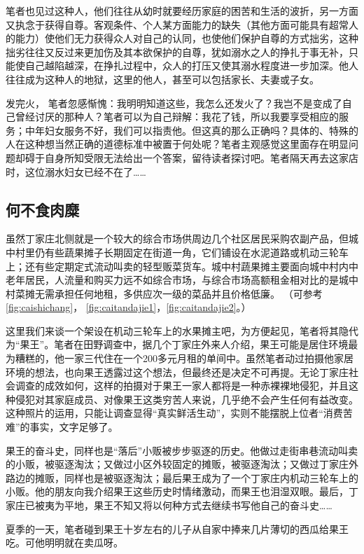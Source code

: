   笔者也见过这种人，他们往往从幼时就要经历家庭的困苦和生活的波折，另一方面又执念于获得自尊。客观条件、个人某方面能力的缺失（其他方面可能具有超常人的能力）使他们无力获得众人对自己的认同，也使他们保护自尊的方式拙劣，这种拙劣往往又反过来更加伤及其本欲保护的自尊，犹如溺水之人的挣扎于事无补，只能使自己越陷越深，在挣扎过程中，众人的打压又使其溺水程度进一步加深。他人往往成为这种人的地狱，这里的他人，甚至可以包括家长、夫妻或子女。

  发完火， 笔者忽感惭愧：我明明知道这些，我怎么还发火了？我岂不是变成了自己曾经讨厌的那种人？笔者可以为自己辩解：我花了钱，所以我要享受相应的服务；中年妇女服务不好，我们可以指责他。但这真的那么正确吗？具体的、特殊的人在这种想当然正确的道德标准中被置于何处呢？笔者主观感觉这里面存在明显问题却碍于自身所知受限无法给出一个答案，留待读者探讨吧。笔者隔天再去这家店时，这位溺水妇女已经不在了……

  \subsection{何不食肉糜}

  虽然丁家庄北侧就是一个较大的综合市场供周边几个社区居民采购农副产品，但城中村里仍有些蔬果摊子长期固定在街道一角，它们铺设在水泥道路或机动三轮车上；还有些定期定式流动叫卖的轻型贩菜货车。城中村蔬果摊主要面向城中村内中老年居民，人流量和购买力远不如综合市场，与综合市场高额租金相对比的是城中村菜摊无需承担任何地租，多供应次一级的菜品并且价格低廉。 （可参考\cref{fig:caishichang}， \cref{fig:caitandajie1}，\cref{fig:caitandajie2}。）

  这里我们来谈一个架设在机动三轮车上的水果摊主吧，为方便起见，笔者将其隐代为“果王”。笔者在田野调查中，据几个丁家庄外来人介绍，果王可能是居住环境最为糟糕的，他一家三代住在一个200多元月租的单间中。虽然笔者动过拍摄他家居环境的想法，也向果王透露过这个想法，但最终还是决定不可再提。无论丁家庄社会调查的成效如何，这样的拍摄对于果王一家人都将是一种赤裸裸地侵犯，并且这种侵犯对其家庭成员、对像果王这类穷苦人来说，几乎绝不会产生任何有益改变。这种照片的运用，只能让调查显得“真实鲜活生动”，实则不能摆脱上位者“消费苦难”的事实，文字足够了。

  果王的奋斗史，同样也是“落后”小贩被步步驱逐的历史。他做过走街串巷流动叫卖的小贩，被驱逐淘汰；又做过小区外较固定的摊贩，被驱逐淘汰；又做过丁家庄外路边的摊贩，同样也是被驱逐淘汰；最后果王成为了一个丁家庄内机动三轮车上的小贩。他的朋友向我介绍果王这些历史时情绪激动，而果王也泪湿双眼。最后，丁家庄已被夷为平地，果王不知又将以何种方式去继续书写他自己的奋斗史……

  夏季的一天，笔者碰到果王十岁左右的儿子从自家中捧来几片薄切的西瓜给果王吃。可他明明就在卖瓜呀。

